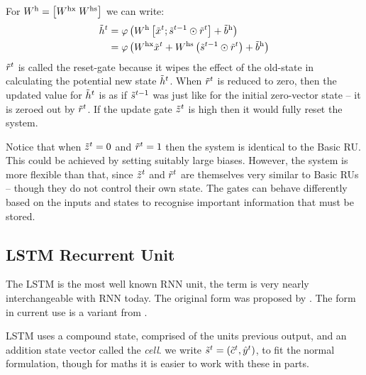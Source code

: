 \documentclass[12pt,parskip]{komatufte}
\begin{document}
For $\d W_h = \left[\d W_{hx}\; \d W_{hs} \right]$ we can write:
\begin{align}
\nv h_t &= \varphi \left( \d W_h\left[\nv x_t; \nv s_{t-1} \odot \nv r_t\right] + \dv b_h \right)  \\
&= \varphi \left( \d W_{hx} \nv x_t + \d W_{hs} \left( \nv s_{t-1} \odot \nv r_t \right) + \dv b_h \right)
\end{align}
%
$\nv r_t$ is called the reset-gate because it wipes the effect of the old-state in calculating the potential new state $\nv h_t$.
When $\nv r_t$ is reduced to zero, then the updated value for $\nv h_t$ is as if $\nv s_{t-1}$ was just like for the initial zero-vector state -- it is zeroed out by $\nv r_t$.
If the update gate $\nv z_t$ is high then it would fully reset the system.


Notice that when $\nv z_t=0$ and $\nv r_t=1$ then the system is identical to the Basic RU.
This could be achieved by setting suitably large biases.
However, the system is more flexible than that, 
since $\nv z_t$ and $\nv r_t$ are themselves very similar to Basic RUs -- though they do not control their own state.
The gates can behave differently based on the inputs and states to recognise important information that must be stored.



\subsection{LSTM Recurrent Unit}\label{sec:ltsm}
The LSTM is the most well known RNN unit, the term is very nearly interchangeable with RNN today.
The original form was proposed by .
The form in current use is a variant from .

LSTM uses a compound state, comprised of the units previous output, and an addition state vector called the \emph{cell}.
we write $\nv s_t = (\nv c_t, \n \hat{y}_t)$,
to fit the normal formulation,
though for maths it is easier to work with these in parts.

\end{document}
